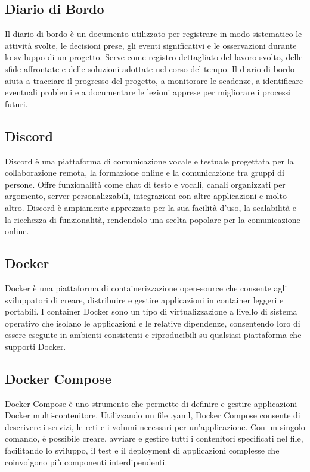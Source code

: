 \subsection*{Diario di Bordo} 
Il diario di bordo è un documento utilizzato per registrare in modo sistematico le attività svolte, le decisioni prese, gli eventi significativi e le osservazioni durante lo sviluppo di un progetto. Serve come registro dettagliato del lavoro svolto, delle sfide affrontate e delle soluzioni adottate nel corso del tempo. Il diario di bordo aiuta a tracciare il progresso del progetto, a monitorare le scadenze, a identificare eventuali problemi e a documentare le lezioni apprese per migliorare i processi futuri.
\subsection*{Discord} 
Discord è una piattaforma di comunicazione vocale e testuale progettata per la collaborazione remota, la formazione online e la comunicazione tra gruppi di persone. Offre funzionalità come chat di testo e vocali, canali organizzati per argomento, server personalizzabili, integrazioni con altre applicazioni e molto altro. Discord è ampiamente apprezzato per la sua facilità d'uso, la scalabilità e la ricchezza di funzionalità, rendendolo una scelta popolare per la comunicazione online.
\subsection*{Docker} 
Docker è una piattaforma di containerizzazione open-source che consente agli sviluppatori di creare, distribuire e gestire applicazioni in container leggeri e portabili. I container Docker sono un tipo di virtualizzazione a livello di sistema operativo che isolano le applicazioni e le relative dipendenze, consentendo loro di essere eseguite in ambienti consistenti e riproducibili su qualsiasi piattaforma che supporti Docker.
\subsection*{Docker Compose} 
Docker Compose è uno strumento che permette di definire e gestire applicazioni Docker multi-contenitore. Utilizzando un file .yaml, Docker Compose consente di descrivere i servizi, le reti e i volumi necessari per un'applicazione. Con un singolo comando, è possibile creare, avviare e gestire tutti i contenitori specificati nel file, facilitando lo sviluppo, il test e il deployment di applicazioni complesse che coinvolgono più componenti interdipendenti.

